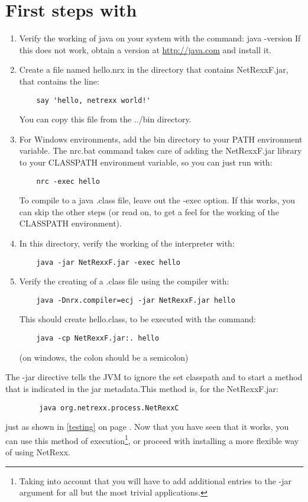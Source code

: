 \section{First steps with \nr{}}
\begin{enumerate}
\item Verify the working of java on your system with the command:
	java -version\newline
If this does not work, obtain a version at \url{http://java.com} and install it.

\item Create a file named hello.nrx in the directory that contains
  NetRexxF.jar, that contains  the line:
\begin{verbatim}
	say 'hello, netrexx world!'
\end{verbatim}
You can copy this file from the ../bin directory.
\item For Windows environments, add the bin directory to your PATH
  environment variable. The nrc.bat command takes care of adding the
  NetRexxF.jar library to your CLASSPATH environment variable,  so you
  can just run with:
\begin{verbatim}
	nrc -exec hello
\end{verbatim}
To compile to a java .class file, leave out the -exec option. If this
works, you can skip the other steps (or read on, to get a feel for the
working of the CLASSPATH environment).
\item In this directory, verify the working of the interpreter with:
\begin{verbatim}
	java -jar NetRexxF.jar -exec hello
\end{verbatim}
\item Verify the creating of a .class file using the compiler with:
\begin{verbatim}
	java -Dnrx.compiler=ecj -jar NetRexxF.jar hello
\end{verbatim}
This should create hello.class, to be executed with the command:
\begin{verbatim}
	java -cp NetRexxF.jar:. hello
\end{verbatim}
(on windows, the colon should be a semicolon)
\end{enumerate}
The -jar directive tells the JVM to ignore the set classpath and to
start a method that is indicated in the jar metadata.This method is,
for the NetRexxF.jar: 
 \begin{verbatim}
        java org.netrexx.process.NetRexxC
\end{verbatim}
just as shown in \ref{testing} on page \pageref{testing}. Now that you
have seen that it works, you can use this method of
execution\footnote{Taking into account that you will have to add
  additional entries to the -jar argument for all but the most trivial
applications.}, or
proceed with installing a more flexible way of using NetRexx.

